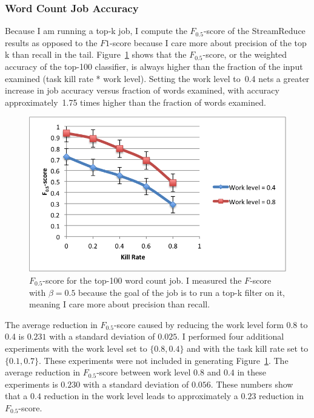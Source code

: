 \documentclass[12pt,twocolumn]{article}
\begin{document}
\subsubsection{Word Count Job Accuracy}
Because I am running a top-k job, I compute the $F_{0.5}$-score of the StreamReduce results as
opposed to the $F1$-score because I care more about precision of the top k than recall
in the tail. Figure~\ref{fig:fscore} shows that the $F_{0.5}$-score, or the weighted
accuracy of the top-100 classifier, is always higher than the fraction of the input
examined (task kill rate * work level). Setting the work level to~0.4 nets a greater increase
in job accuracy versus fraction of words examined, with accuracy approximately~1.75 times
higher than the fraction of words examined.

\begin{figure}
\includegraphics[width=\linewidth]{f-score.png}
\caption{$F_{0.5}$-score for the top-100 word count job. I measured the $F$-score with $\beta=0.5$ because the goal of the job is to run a top-k filter on it, meaning I care more about precision than recall.}
\label{fig:fscore}
\end{figure}

The average reduction in $F_{0.5}$-score caused by reducing the work level form 0.8 to 0.4 is
$0.231$ with a standard deviation of $0.025$. I performed four additional experiments with the
work level set to $\{0.8,0.4\}$ and with the task kill rate set to $\{0.1,0.7\}$. These experiments were
not included in generating Figure~\ref{fig:fscore}. The average reduction in $F_{0.5}$-score between
work level $0.8$ and $0.4$ in these experiments is $0.230$ with a standard deviation of
$0.056$. These numbers show that a $0.4$ reduction in the work level leads to approximately a
$0.23$ reduction in $F_{0.5}$-score.
\end{document}
